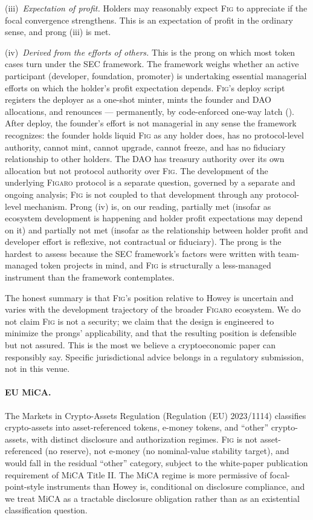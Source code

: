 \documentclass[11pt,a4paper]{article}
\theoremstyle{definition}
\theoremstyle{remark}
\newcommand{\figaro}{\textsc{Figaro}}
\newcommand{\fig}{\textsc{Fig}}
\begin{document}
(iii)~\emph{Expectation of profit.} Holders may reasonably
expect \fig{} to appreciate if the focal convergence
strengthens. This is an expectation of profit in the ordinary
sense, and prong (iii) is met.

(iv)~\emph{Derived from the efforts of others.} This is the
prong on which most token cases turn under the SEC framework.
The framework weighs whether an active participant (developer,
foundation, promoter) is undertaking essential managerial efforts
on which the holder's profit expectation depends. \fig{}'s
deploy script registers the deployer as a one-shot minter,
mints the founder and DAO allocations, and renounces ---
permanently, by code-enforced one-way latch
(). After deploy, the founder's effort is not
managerial in any sense the framework recognizes: the founder
holds liquid \fig{} as any holder does, has no protocol-level
authority, cannot mint, cannot upgrade, cannot freeze, and has
no fiduciary relationship to other holders. The DAO has
treasury authority over its own allocation but not protocol
authority over \fig{}. The development of the underlying
\figaro{} protocol is a separate question, governed by a
separate and ongoing analysis; \fig{} is not coupled to that
development through any protocol-level mechanism. Prong (iv)
is, on our reading, partially met (insofar as ecosystem
development is happening and holder profit expectations may
depend on it) and partially not met (insofar as the
relationship between holder profit and developer effort is
reflexive, not contractual or fiduciary). The prong is the
hardest to assess because the SEC framework's factors were
written with team-managed token projects in mind, and \fig{}
is structurally a less-managed instrument than the framework
contemplates.

The honest summary is that \fig{}'s position relative to Howey
is uncertain and varies with the development trajectory of the
broader \figaro{} ecosystem. We do not claim \fig{} is not a
security; we claim that the design is engineered to minimize
the prongs' applicability, and that the resulting position is
defensible but not assured. This is the most we believe a
cryptoeconomic paper can responsibly say. Specific
jurisdictional advice belongs in a regulatory submission, not
in this venue.

\paragraph{EU MiCA.}
The Markets in Crypto-Assets Regulation (Regulation (EU)
2023/1114) classifies crypto-assets into asset-referenced
tokens, e-money tokens, and ``other'' crypto-assets, with
distinct disclosure and authorization regimes. \fig{} is not
asset-referenced (no reserve), not e-money (no nominal-value
stability target), and would fall in the residual ``other''
category, subject to the white-paper publication requirement
of MiCA Title II. The MiCA regime is more permissive of
focal-point-style instruments than Howey is, conditional on
disclosure compliance, and we treat MiCA as a tractable
disclosure obligation rather than as an existential
classification question.
\end{document}
